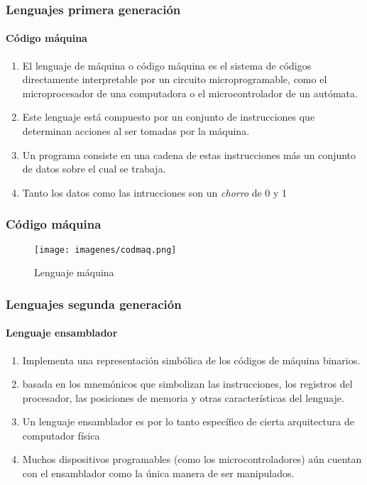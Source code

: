 \documentclass{beamer}
\begin{document}
\begin{frame}
\frametitle{Lenguajes primera generación}
\framesubtitle{Código máquina}
\begin{enumerate}[<+->]
\item El lenguaje de máquina o código máquina es el sistema de códigos directamente interpretable por un circuito microprogramable, como el microprocesador de una computadora o el microcontrolador de un autómata. 
\item Este lenguaje está compuesto por un conjunto de instrucciones que determinan acciones al ser tomadas por la máquina.  
\item Un programa consiste en una cadena de estas instrucciones más un conjunto de datos sobre el cual se trabaja. 
\item Tanto los datos como las intrucciones son un \emph{chorro} de 0 y 1
\end{enumerate}
\end{frame}

\begin{frame}
\frametitle{Código máquina} 
\begin{figure}
\texttt{[image: imagenes/codmaq.png]} 
\caption{Lenguaje máquina}
\end{figure} 
\end{frame}

\begin{frame}
\frametitle{Lenguajes segunda generación}
\framesubtitle{Lenguaje ensamblador}
\begin{enumerate}[<+->]
\item Implementa una representación simbólica de los códigos de máquina binarios.  
\item basada en los mnemónicos que simbolizan las instrucciones, los registros del procesador, las posiciones de memoria y otras características del lenguaje. 
\item Un lenguaje ensamblador es por lo tanto específico de cierta arquitectura de computador física 
\item Muchos dispositivos programables (como los microcontroladores) aún cuentan con el ensamblador como la única manera de ser manipulados. 
\end{enumerate}
\end{frame}
\end{document}
